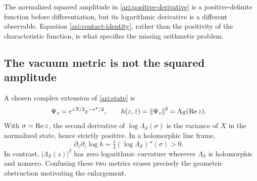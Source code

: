 The normalized squared amplitude in \eqref{ari:positive-derivative} is a positive-definite function before differentiation, but its logarithmic derivative is a different observable. Equation \eqref{ari:contact-identity}, rather than the positivity of the characteristic function, is what specifies the missing arithmetic problem.

\subsection{The vacuum metric is not the squared amplitude}
A chosen complex extension of \eqref{ari:state} is
\[
\Psi_z=e^{zX/2}e^{-e^y/2},\qquad
h(z,\bar z)=\left\lVert\Psi_z\right\rVert^2=\Lambda_{\mathcal S}(\operatorname{Re} z).
\]
With $\sigma=\operatorname{Re} z$, the second derivative of $\log\Lambda_{\mathcal S}(\sigma)$ is the variance of $X$ in the normalized state, hence strictly positive. In a holomorphic line frame,
\[
\partial_{\bar z}\partial_z\log h
=\tfrac14(\log\Lambda_{\mathcal S})''(\sigma)>0.
\]
In contrast, $|\Lambda_{\mathcal S}(z)|^2$ has zero logarithmic curvature wherever $\Lambda_{\mathcal S}$ is holomorphic and nonzero. Confusing these two metrics erases precisely the geometric obstruction motivating the enlargement.
